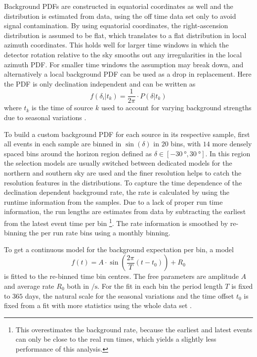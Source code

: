 Background PDFs are constructed in equatorial coordinates as well and the distribution is estimated from data, using the off time data set only to avoid signal contamination.
By using equatorial coordinates, the right-ascension distribution is assumed to be flat, which translates to a flat distribution in local azimuth coordinates.
This holds well for larger time windows in which the detector rotation relative to the sky smooths out any irregularities in the local azimuth PDF.
For smaller time windows the assumption may break down, and alternatively a local background PDF can be used as a drop in replacement.
Here the PDF is only declination independent and can be written as
\begin{equation}
  f(\delta_i|t_k) = \frac{1}{2\pi}\cdot P(\delta|t_k)
\end{equation}
where $t_k$ is the time of source $k$ used to account for varying background strengths due to seasonal variations .

To build a custom background PDF for each source in its respective sample, first all events in each sample are binned in $\sin(\delta)$ in $20$ bins, with $14$ more densely spaced bins around the horizon region defined as $\delta\in[\SI{-30}{\degree}, \SI{30}{\degree}]$.
In this region the selection models are usually switched between dedicated models for the northern and southern sky are used and the finer resolution helps to catch the resolution features in the distributions.
To capture the time dependence of the declination dependent background rate, the rate is calculated by using the runtime information from the samples.
Due to a lack of proper run time information, the run lengths are estimates from data by subtracting the earliest from the latest event time per bin \footnote{This overestimates the background rate, because the earliest and latest events can only be close to the real run times, which yields a slightly less performance of this analysis.}.
The rate information is smoothed by re-binning the per run rate bins using a monthly binning.

To get a continuous model for the background expectation per bin, a model
\begin{equation}
  f(t)
  = A\cdot
    \sin\left(\frac{2\pi}{T}\left(t - t_0\right)\right) + R_0
\end{equation}
is fitted to the re-binned time bin centres.
The free parameters are amplitude $A$ and average rate $R_0$ both in $\si{\per\s}$.
For the fit in each bin the period length $T$ is fixed to $365$ days, the natural scale for the seasonal variations and the time offset $t_0$ is fixed from a fit with more statistics using the whole data set .

